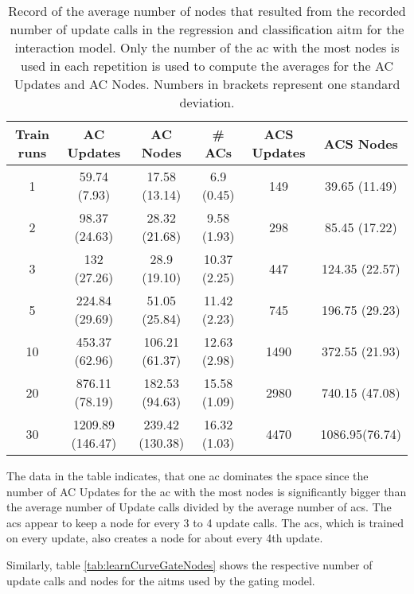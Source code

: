 \begin{table}
\footnotesize 
	\centering
	\begin{tabular*}{\textwidth}{@{\extracolsep{\fill}} c c c c c c}
			\hline \textbf{Train runs} & \textbf{AC Updates}&  \textbf{AC Nodes} & \textbf{\# ACs} & \textbf{ACS Updates} &\textbf{ACS Nodes} \\ 
			\hline \hline 
			 1 & 59.74 (7.93) & 17.58 (13.14) & 6.9 (0.45) & 149 & 39.65 (11.49) \\
			 2 & 98.37 (24.63) & 28.32 (21.68) & 9.58 (1.93) & 298 & 85.45 (17.22) \\  
			 3 & 132 (27.26) & 28.9 (19.10) & 10.37 (2.25) & 447 & 124.35 (22.57) \\
			 5 & 224.84 (29.69) & 51.05 (25.84) & 11.42 (2.23) & 745 & 196.75 (29.23) \\
			 10 & 453.37 (62.96) & 106.21 (61.37) & 12.63 (2.98) & 1490 & 372.55 (21.93) \\
			 20 & 876.11 (78.19) & 182.53 (94.63) & 15.58 (1.09) & 2980 & 740.15 (47.08) \\
			 30 & 1209.89 (146.47) & 239.42 (130.38) & 16.32 (1.03) & 4470 & 1086.95(76.74) \\
			\hline 
	\end{tabular*} 
	\caption{Record of the average number of nodes that resulted from the recorded number of update calls in the regression and classification \gls{aitm} for the interaction model. Only the number of the \gls{ac} with the most nodes is used in each repetition is used to compute the averages for the AC Updates and AC Nodes. Numbers in brackets represent one standard deviation.}
	\label{tab:learnCurveInteractionNodes}
\end{table}

The data in the table indicates, that one \gls{ac} dominates the space since the number of AC Updates for the \gls{ac} with the most nodes is significantly bigger than the average number of Update calls divided by the average number of \glspl{ac}.
The \glspl{ac} appear to keep a node for every 3 to 4 update calls. The \gls{acs}, which is trained on every update, also creates a node for about every 4th update.

Similarly, table \ref{tab:learnCurveGateNodes} shows the respective number of update calls and nodes for the \glspl{aitm} used by the gating model.


